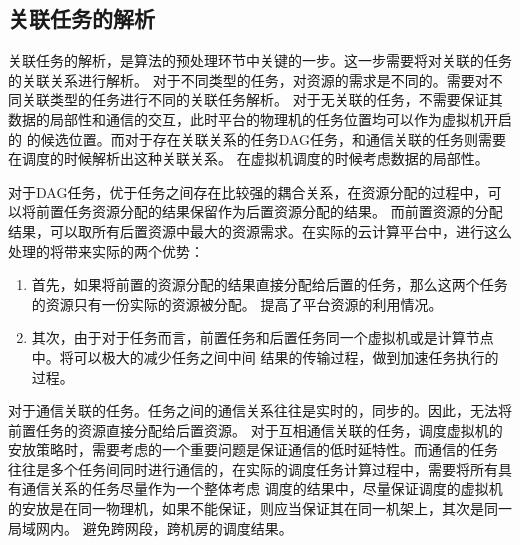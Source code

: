 \subsection{关联任务的解析}
关联任务的解析，是算法的预处理环节中关键的一步。这一步需要将对关联的任务的关联关系进行解析。
对于不同类型的任务，对资源的需求是不同的。需要对不同关联类型的任务进行不同的关联任务解析。
对于无关联的任务，不需要保证其数据的局部性和通信的交互，此时平台的物理机的任务位置均可以作为虚拟机开启的
的候选位置。而对于存在关联关系的任务DAG任务，和通信关联的任务则需要在调度的时候解析出这种关联关系。
在虚拟机调度的时候考虑数据的局部性。

对于DAG任务，优于任务之间存在比较强的耦合关系，在资源分配的过程中，可以将前置任务资源分配的结果保留作为后置资源分配的结果。
而前置资源的分配结果，可以取所有后置资源中最大的资源需求。在实际的云计算平台中，进行这么处理的将带来实际的两个优势：
\begin{enumerate}
\item 首先，如果将前置的资源分配的结果直接分配给后置的任务，那么这两个任务的资源只有一份实际的资源被分配。
提高了平台资源的利用情况。
\item 其次，由于对于任务而言，前置任务和后置任务同一个虚拟机或是计算节点中。将可以极大的减少任务之间中间
结果的传输过程，做到加速任务执行的过程。
\end{enumerate}

对于通信关联的任务。任务之间的通信关系往往是实时的，同步的。因此，无法将前置任务的资源直接分配给后置资源。
对于互相通信关联的任务，调度虚拟机的安放策略时，需要考虑的一个重要问题是保证通信的低时延特性。而通信的任务
往往是多个任务间同时进行通信的，在实际的调度任务计算过程中，需要将所有具有通信关系的任务尽量作为一个整体考虑
调度的结果中，尽量保证调度的虚拟机的安放是在同一物理机，如果不能保证，则应当保证其在同一机架上，其次是同一局域网内。
避免跨网段，跨机房的调度结果。

